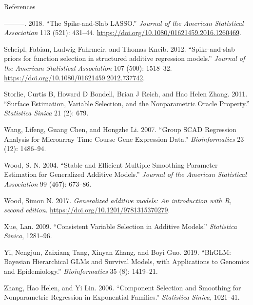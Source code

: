 \documentclass[
  ignorenonframetext,
  aspectratio=169]{beamer}
\newlength{\cslhangindent}
\newlength{\cslentryspacingunit} %
\newenvironment{CSLReferences}[2] %
 {%
  \setlength{\parindent}{0pt}
  \ifodd #1
  \let\oldpar\par
  \def\par{\hangindent=\cslhangindent\oldpar}
  \fi
  \setlength{\parskip}{#2\cslentryspacingunit}
 }%
 {}
\begin{document}
\begin{frame}[allowframebreaks]{References}
\begin{CSLReferences}{1}{0}
\leavevmode{}%
---------. 2018. {``{The Spike-and-Slab LASSO}.''} \emph{Journal of the
American Statistical Association} 113 (521): 431--44.
\url{https://doi.org/10.1080/01621459.2016.1260469}.

\leavevmode{}%
Scheipl, Fabian, Ludwig Fahrmeir, and Thomas Kneib. 2012.
{``{Spike-and-slab priors for function selection in structured additive
regression models}.''} \emph{Journal of the American Statistical
Association} 107 (500): 1518--32.
\url{https://doi.org/10.1080/01621459.2012.737742}.

\leavevmode{}%
Storlie, Curtis B, Howard D Bondell, Brian J Reich, and Hao Helen Zhang.
2011. {``Surface Estimation, Variable Selection, and the Nonparametric
Oracle Property.''} \emph{Statistica Sinica} 21 (2): 679.

\leavevmode{}%
Wang, Lifeng, Guang Chen, and Hongzhe Li. 2007. {``Group SCAD Regression
Analysis for Microarray Time Course Gene Expression Data.''}
\emph{Bioinformatics} 23 (12): 1486--94.

\leavevmode{}%
Wood, S. N. 2004. {``Stable and Efficient Multiple Smoothing Parameter
Estimation for Generalized Additive Models.''} \emph{Journal of the
American Statistical Association} 99 (467): 673--86.

\leavevmode{}%
Wood, Simon N. 2017. \emph{{Generalized additive models: An introduction
with R, second edition}}. \url{https://doi.org/10.1201/9781315370279}.

\leavevmode{}%
Xue, Lan. 2009. {``Consistent Variable Selection in Additive Models.''}
\emph{Statistica Sinica}, 1281--96.

\leavevmode{}%
Yi, Nengjun, Zaixiang Tang, Xinyan Zhang, and Boyi Guo. 2019. {``BhGLM:
Bayesian Hierarchical GLMs and Survival Models, with Applications to
Genomics and Epidemiology.''} \emph{Bioinformatics} 35 (8): 1419--21.

\leavevmode{}%
Zhang, Hao Helen, and Yi Lin. 2006. {``Component Selection and Smoothing
for Nonparametric Regression in Exponential Families.''}
\emph{Statistica Sinica}, 1021--41.

\end{CSLReferences}
\end{frame}
\end{document}
